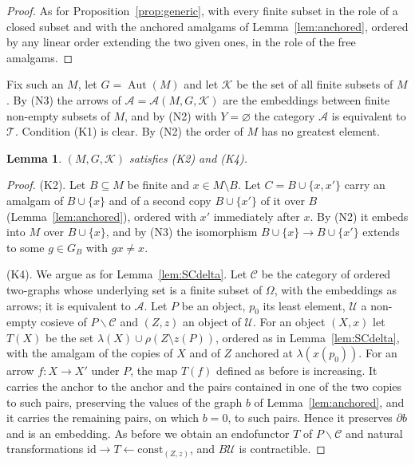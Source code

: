\documentclass[11pt,a4paper]{article}
\newtheorem{lemma}[theorem]{Lemma}
\theoremstyle{definition}
\newcommand{\Aut}{\operatorname{Aut}}
\newcommand{\id}{\mathrm{id}}
\newcommand{\K}{\mathcal{K}}
\begin{document}
\begin{proof}
As for Proposition~\ref{prop:generic}, with every finite subset in the role
of a closed subset and with the anchored amalgams of Lemma~\ref{lem:anchored},
ordered by any linear order extending the two given ones, in the role of the
free amalgams.
\end{proof}

Fix such an $M$, let $G=\Aut(M)$ and let $\K$ be the set of all finite subsets
of $M$. By (N3) the arrows of $\mathcal A=\mathcal A(M,G,\K)$ are the embeddings
between finite non-empty subsets of $M$, and by (N2) with $Y=\varnothing$ the
category $\mathcal A$ is equivalent to $\mathcal T$. Condition (K1) is clear.
By (N2) the order of $M$ has no greatest element.

\begin{lemma}\label{lem:K24two}
$(M,G,\K)$ satisfies \textup{(K2)} and \textup{(K4)}.
\end{lemma}

\begin{proof}
(K2). Let $B\subseteq M$ be finite and $x\in M\setminus B$. Let
$C=B\cup\{x,x'\}$ carry an amalgam of $B\cup\{x\}$ and of a second copy
$B\cup\{x'\}$ of it over $B$ (Lemma~\ref{lem:anchored}), ordered with $x'$
immediately after $x$. By (N2) it embeds into $M$ over $B\cup\{x\}$, and by
(N3) the isomorphism $B\cup\{x\}\to B\cup\{x'\}$ extends to some $g\in G_B$
with $gx\ne x$.

(K4). We argue as for Lemma~\ref{lem:SCdelta}. Let $\mathcal C$ be the
category of ordered two-graphs whose underlying set is a finite subset of
$\Omega$, with the embeddings as arrows; it is equivalent to $\mathcal A$. Let
$P$ be an object, $p_0$ its least element, $\mathcal U$ a non-empty cosieve of
$P\backslash\mathcal C$ and $(Z,z)$ an object of $\mathcal U$. For an object
$(X,x)$ let $T(X)$ be the set $\lambda(X)\cup\rho(Z\setminus z(P))$, ordered
as in Lemma~\ref{lem:SCdelta}, with the amalgam of the copies of $X$ and of
$Z$ anchored at $\lambda(x(p_0))$. For an arrow $f\colon X\to X'$ under $P$,
the map $T(f)$ defined as before is increasing. It carries the anchor to the
anchor and the pairs contained in one of the two copies to such pairs,
preserving the values of the graph $b$ of Lemma~\ref{lem:anchored}, and it
carries the remaining pairs, on which $b=0$, to such pairs. Hence it
preserves $\partial b$ and is an embedding. As before we obtain an
endofunctor $T$ of $P\backslash\mathcal C$ and natural transformations
$\id\to T\leftarrow\mathrm{const}_{(Z,z)}$, and $B\mathcal U$ is contractible.
\end{proof}
\end{document}
